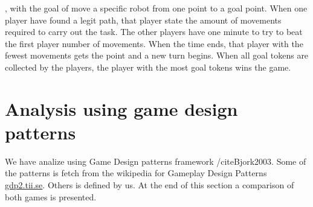 \documentclass[a4paper]{article}
\begin{document}
, with the goal of move a specific robot from one point to a goal point. When one player have found a legit path, that player state the amount of movements required to carry out the task. The other players have one minute to try to beat the first player number of movements. When the time ends, that player with the fewest movements gets the point and a new turn begins. When all goal tokens are collected by the players, the player with the most goal tokens wins the game.

\section{Analysis using game design patterns}
We have analize using Game Design patterns framework /cite{Bjork2003}. Some of the patterns is fetch from the wikipedia for Gameplay Design Patterns \url{gdp2.tii.se}. Others is defined by us. At the end of this section a comparison of both games is presented.

\newpage
\end{document}
